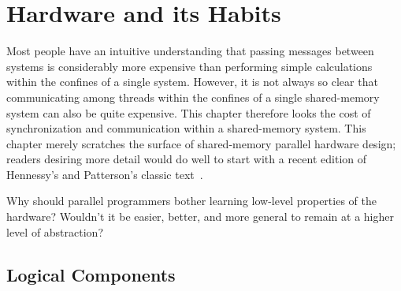 
\chapter{Hardware and its Habits}
\label{chp:Hardware and its Habits}


Most people have an intuitive understanding that passing messages between
systems is considerably more expensive than performing simple calculations
within the confines of a single system.
However, it is not always so clear that communicating among threads within
the confines of a single shared-memory system can also be quite expensive.
This chapter therefore looks the cost of synchronization and communication
within a shared-memory system.
This chapter merely scratches the surface of shared-memory parallel
hardware design; readers desiring more detail would do well to start
with a recent edition of
Hennessy's and Patterson's classic text~\cite{Hennessy95a}.

\QuickQuiz{}
	Why should parallel programmers bother learning low-level
	properties of the hardware?
	Wouldn't it be easier, better, and more general to remain at
	a higher level of abstraction?
 \QuickQuizEnd




\section{Logical Components}
\label{sec:cpu:Logical Components}

